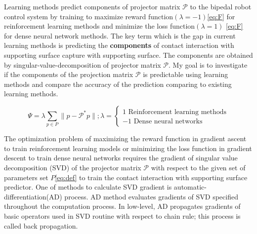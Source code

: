\vspace{4mm}

 
 Learning methods predict components of projector matrix $\mathcal{P}$ to the bipedal robot control system by training to maximize reward function$(\lambda=-1)$\ref{eq:F} for reinforcement learning methods and minimize the loss  function$(\lambda=1)$ \ref{eq:F} for dense neural network methods. The key term which is the gap in current learning methods is predicting the \textbf{components} of contact interaction with supporting surface capture with supporting surface. The components are obtained 
 by singular-value-decomposition of projector matrix $\mathcal{P}$. My goal is to investigate if the components of the projection matrix $\mathcal{P}$ is predictable using learning methods and compare the accuracy of the prediction comparing to existing learning methods.

\vspace{4mm}

\begin{equation}
    \label{eq:F}
    \Psi = \lambda \sum_{p \in P} \| p - \mathcal{P}^* p\| ;
    \lambda = \begin{cases}
        1 \text{ Reinforcement learning methods}\\
        -1 \text{ Dense neural networks}
    \end{cases}
\end{equation}

\vspace{4mm}

The optimization problem of maximizing the reward function in gradient ascent \cite{gas11046} to train reinforcement learning models\cite{rl48550} or minimizing the loss function in gradient descent \cite{gdc04747} to train dense neural networks\cite{dnn8501736} requires the gradient of singular value decomposition (SVD) of the projector matrix $\mathcal{P}$ with respect to the given set of parameters set $P$\ref{eq:def} to train the contact interaction with supporting surface predictor\cite{gdc04747,gas11046}. One of methods to calculate SVD gradient is automatic-differentiation(AD) process. AD method evaluates gradients of SVD specified throughout the computation process. In low-level, AD propagates gradients of basic operators used in SVD routine with respect to chain rule; this process is called back propagation\cite{grad02659}. 

